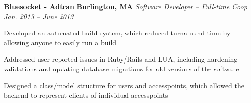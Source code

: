 \item
\headerrow
{\textbf{Bluesocket - Adtran}}
{\textbf{Burlington, MA}}
\headerrow
{\emph{Software Developer -- Full-time Coop}}
{\emph{Jan. 2013 -- June 2013}}
\begin{itemize*}
    \item Developed an automated build system, which reduced turnaround time by
    allowing anyone to easily run a build
    \item Addressed user reported issues in Ruby/Rails and LUA, including
    hardening validations and updating database migrations for old versions
    of the software
    \item Designed a class/model structure for users and accesspoints, which
    allowed the backend to represent clients of individual accesspoints
\end{itemize*}
